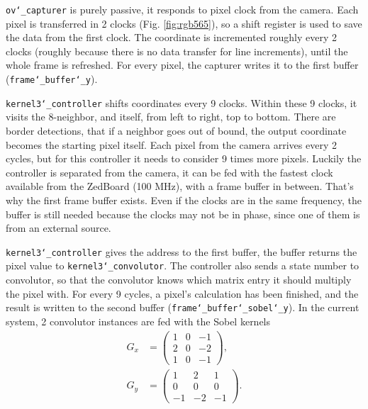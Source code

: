\documentclass{IEEEtran}
\begin{document}
	\texttt{ov\char`_capturer} is purely passive, it responds to pixel clock from the camera. Each pixel is transferred in 2 clocks (Fig. \ref{fig:rgb565}), so a shift register is used to save the data from the first clock. The coordinate is incremented roughly every 2 clocks (roughly because there is no data transfer for line increments), until the whole frame is refreshed. For every pixel, the capturer writes it to the first buffer (\texttt{frame\char`_buffer\char`_y}).
	
	\texttt{kernel3\char`_controller} shifts coordinates every 9 clocks. Within these 9 clocks, it visits the 8-neighbor, and itself, from left to right, top to bottom. There are border detections, that if a neighbor goes out of bound, the output coordinate becomes the starting pixel itself. Each pixel from the camera arrives every 2 cycles, but for this controller it needs to consider 9 times more pixels. Luckily the controller is separated from the camera, it can be fed with the fastest clock available from the ZedBoard (100 MHz), with a frame buffer in between. That’s why the first frame buffer exists. Even if the clocks are in the same frequency, the buffer is still needed because the clocks may not be in phase, since one of them is from an external source.
	
	\texttt{kernel3\char`_controller} gives the address to the first buffer, the buffer returns the pixel value to \texttt{kernel3\char`_convolutor}. The controller also sends a state number to convolutor, so that the convolutor knows which matrix entry it should multiply the pixel with. For every 9 cycles, a pixel’s calculation has been finished, and the result is written to the second buffer (\texttt{frame\char`_buffer\char`_sobel\char`_y}). In the current system, 2 convolutor instances are fed with the Sobel kernels \cite{sobel}
	\begin{align*}
		G_x&=
		\begin{pmatrix}
			1&0&-1\\
			2&0&-2\\
			1&0&-1
		\end{pmatrix},\\
		G_y&=
		\begin{pmatrix}
			1&2&1\\
			0&0&0\\
			-1&-2&-1
		\end{pmatrix}.
	\end{align*}
	
\end{document}
